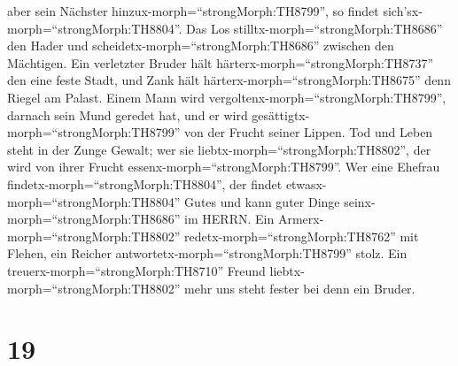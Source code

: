 aber sein Nächster hinzux-morph=``strongMorph:TH8799'', so findet
sich'sx-morph=``strongMorph:TH8804''.  Das Los
stilltx-morph=``strongMorph:TH8686'' den Hader und
scheidetx-morph=``strongMorph:TH8686'' zwischen den Mächtigen.
 Ein verletzter Bruder hält
härterx-morph=``strongMorph:TH8737'' den eine feste Stadt, und Zank hält
härterx-morph=``strongMorph:TH8675'' denn Riegel am Palast.
 Einem Mann wird vergoltenx-morph=``strongMorph:TH8799'',
darnach sein Mund geredet hat, und er wird
gesättigtx-morph=``strongMorph:TH8799'' von der Frucht seiner Lippen.
 Tod und Leben steht in der Zunge Gewalt; wer sie
liebtx-morph=``strongMorph:TH8802'', der wird von ihrer Frucht
essenx-morph=``strongMorph:TH8799''.  Wer eine Ehefrau
findetx-morph=``strongMorph:TH8804'', der findet
etwasx-morph=``strongMorph:TH8804'' Gutes und kann guter Dinge
seinx-morph=``strongMorph:TH8686'' im HERRN.  Ein
Armerx-morph=``strongMorph:TH8802'' redetx-morph=``strongMorph:TH8762''
mit Flehen, ein Reicher antwortetx-morph=``strongMorph:TH8799'' stolz.
 Ein treuerx-morph=``strongMorph:TH8710'' Freund
liebtx-morph=``strongMorph:TH8802'' mehr uns steht fester bei denn ein
Bruder.

\hypertarget{section-18}{%
\section{19}\label{section-18}}

